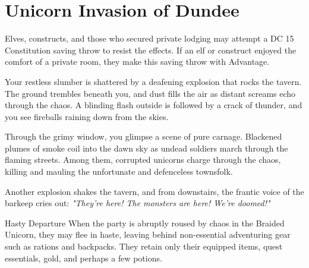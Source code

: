 \chapter*{Unicorn Invasion of Dundee}\label{chapter:UnicornInvasionOfDundee}

{\entryfont Elves, constructs, and those who secured private lodging may attempt a DC 15 Constitution saving throw to resist the effects. If an elf or construct enjoyed the comfort of a private room, they make this saving throw with Advantage.}

\begin{DndReadAloud}
	Your restless slumber is shattered by a deafening explosion that rocks the tavern. The ground trembles beneath you, and dust fills the air as distant screams echo through the chaos. A blinding flash outside is followed by a crack of thunder, and you see fireballs raining down from the skies.

	Through the grimy window, you glimpse a scene of pure carnage. Blackened plumes of smoke coil into the dawn sky as undead soldiers march through the flaming streets. Among them, corrupted unicorns charge through the chaos, killing and mauling the unfortunate and defenceless townsfolk.

	Another explosion shakes the tavern, and from downstairs, the frantic voice of the barkeep cries out: \textit{"They're here! The monsters are here! We're doomed!"}
\end{DndReadAloud}

\begin{DndOptionalRule}{Hasty Departure}\label{or:HastyDeparture}%
	When the party is abruptly roused by chaos in the Braided Unicorn, they may flee in haste, leaving behind non-essential adventuring gear such as rations and backpacks. They retain only their equipped items, quest essentials, gold, and perhaps a few potions.
\end{DndOptionalRule}

